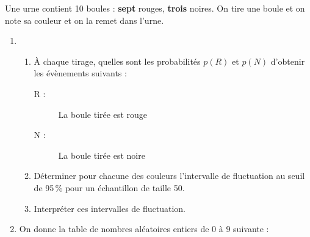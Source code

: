 \begin{exo}[8 points]\label{ds10exo1}
Une urne contient 10 boules : \textbf{sept} rouges, \textbf{trois} noires. On tire une boule et on note sa couleur et on la remet dans l'urne.
\begin{enumerate}
\item \begin{enumerate}
       \item \`A chaque tirage, quelles sont les probabilit\'es $p(R)$ et $p(N)$ d'obtenir les \'ev\`enements suivants :
       \vspace{-1em}\begin{multicols}{2}\begin{description}
        \item[R :] \og{} La boule tir\'ee est rouge \fg{}
        \item[N :] \og{} La boule tir\'ee est noire \fg{}
       \end{description}\end{multicols}\vspace{-1em}
       \item\label{ds9q1} D\'eterminer pour chacune des couleurs l'intervalle de fluctuation au seuil de 95\,\% pour un \'echantillon de taille 50.
       \item Interpr\'eter ces intervalles de fluctuation.
      \end{enumerate}
\item On donne la table de nombres aléatoires entiers de 0 à 9 suivante : 
	\reinitrand[first=0, last=9]
\begin{center}
\rand{} \quad \rand{} \quad \rand{} \quad \rand{} \quad \rand{} \quad \rand{} \quad \rand{} \quad \rand{} \quad \rand{} \quad \rand{} \quad \rand{} \quad \rand{} \quad \rand{} \quad \rand{} \quad \rand{} \quad \rand{} \quad \rand{} \quad \rand{} \quad \rand{} \quad \rand{}

\rand{} \quad \rand{} \quad \rand{} \quad \rand{} \quad \rand{} \quad \rand{} \quad \rand{} \quad \rand{} \quad \rand{} \quad \rand{} \quad \rand{} \quad \rand{} \quad \rand{} \quad \rand{} \quad \rand{} \quad \rand{} \quad \rand{} \quad \rand{} \quad \rand{} \quad \rand{}


\end{center}
\end{enumerate}
\end{exo}
